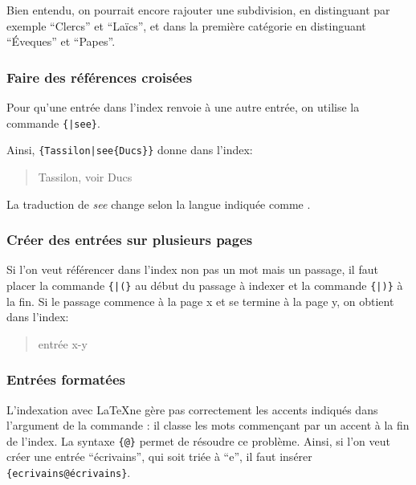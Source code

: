 Bien entendu, on pourrait encore rajouter une subdivision, en distinguant par exemple \enquote{Clercs} et \enquote{Laïcs}, et dans la première catégorie en distinguant \enquote{Éveques} et \enquote{Papes}. 


 
\subsubsection{Faire des références croisées}

Pour qu'une entrée dans l'index renvoie à une autre entrée, on utilise la commande  \verb|{|\verb+|see+\verb|}|. 

Ainsi,  \verb+{Tassilon|see{Ducs}}+ donne dans l'index:

\begin{quotation}
Tassilon, voir Ducs
\end{quotation}
La traduction de \emph{see} change selon la langue indiquée comme . 



  

\subsubsection{Créer des entrées sur plusieurs pages}

Si l'on veut référencer dans l'index non pas un mot mais un passage, il faut placer la commande \verb|{|\verb+|(}+ au début du passage à indexer et la commande  \verb|{|\verb+|)}+ à la fin. Si le passage commence à la page x et se termine à la page y, on obtient dans l'index: 

\begin{quotation}
entrée x-y
\end{quotation}


\subsubsection{Entrées formatées}

L'indexation avec \LaTeX ne gère pas correctement les accents indiqués dans l'argument de la commande  : il classe les mots commençant par un accent à la fin de l'index. La syntaxe \verb|{|\verb|@|\verb+}+ permet de résoudre ce problème. Ainsi, si l'on veut créer une entrée \enquote{écrivains}, qui soit triée à \enquote{e}, il faut insérer \verb|{ecrivains@écrivains}|.

